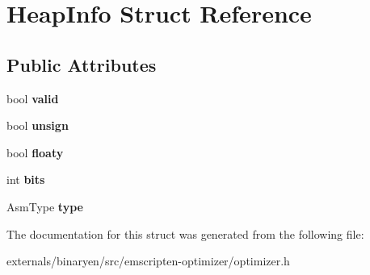 \hypertarget{struct_heap_info}{}\section{Heap\+Info Struct Reference}
\label{struct_heap_info}
\subsection*{Public Attributes}
\begin{DoxyCompactItemize}
\item 
\mbox{\label{struct_heap_info_ab7f800e5f39e27be4c7bd1f44a8aa47b}} 
bool {\bfseries valid}
\item 
\mbox{\label{struct_heap_info_a91fc120fe443555cb9c2f3c030c29e27}} 
bool {\bfseries unsign}
\item 
\mbox{\label{struct_heap_info_a533804075a73127badfd80173c45b839}} 
bool {\bfseries floaty}
\item 
\mbox{\label{struct_heap_info_a4d5e53620e383398fcf13cb837a94c1b}} 
int {\bfseries bits}
\item 
\mbox{\label{struct_heap_info_a5db780130d42a7dad5e6509ad4bbe29d}} 
Asm\+Type {\bfseries type}
\end{DoxyCompactItemize}


The documentation for this struct was generated from the following file\+:\begin{DoxyCompactItemize}
\item 
externals/binaryen/src/emscripten-\/optimizer/optimizer.\+h\end{DoxyCompactItemize}
